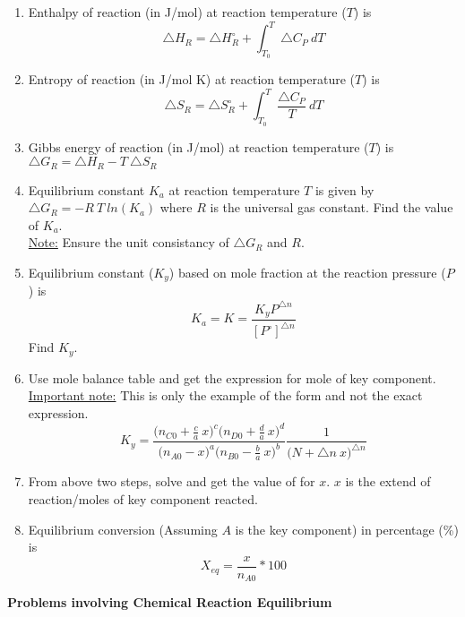 \documentclass[a4paper,10pt]{article}
\begin{document}
\begin{enumerate}
    \item Enthalpy of reaction (in J/mol) at reaction temperature ($T$) is $$\triangle H_R=\triangle H_R^{\circ}+\int_{T_0}^{T} \triangle C_P\ dT $$
    
    \item Entropy of reaction (in J/mol K) at reaction temperature ($T$) is $$\triangle S_R=\triangle S_R^{\circ}+\int_{T_0}^{T} \frac{\triangle C_P}{T}\ dT $$
    
    \item Gibbs energy of reaction (in J/mol) at reaction temperature ($T$) is $\triangle G_R=\triangle H_R-T\ \triangle S_R$
    
    \item Equilibrium constant $K_a$ at reaction temperature $T$ is given by $\triangle G_R = - R\ T\ ln(K_a)$ where $R$ is the universal gas constant. Find the value of $K_a$. \\\underline{Note:} Ensure the unit consistancy of $\triangle G_R$ and $R$.
    
    \item Equilibrium constant ($K_y$) based on mole fraction at the reaction pressure ($P$) is $$K_a=K=\frac{K_y P^{\triangle n}}{[P^{\circ}]^{\triangle n}}$$ Find $K_y$.
    
    \item Use mole balance table and get the expression for mole of key component.\\\underline{Important note:} This is only the example of the form and not the exact expression.$$K_y=\frac{\bigg( n_{C0} + \frac{c}{a}\ x \bigg)^c \bigg(n_{D0} + \frac{d}{a}\ x\bigg)^d}{\bigg(n_{A0} - x \bigg)^a \bigg( n_{B0} - \frac{b}{a}\ x \bigg)^b}\frac{1}{\bigg( N+\triangle n\ x \bigg)^{\triangle n}}$$
    
    \item From above two steps, solve and get the value of for $x$. $x$ is the extend of reaction/moles of key component reacted.
    
    \item Equilibrium conversion (Assuming $A$ is the key component) in percentage (\%) is $$\boxed{X_{eq}=\frac{x}{n_{A0}}*100}$$
\end{enumerate}
\newpage
\textbf{Problems involving Chemical Reaction Equilibrium}
\end{document}
